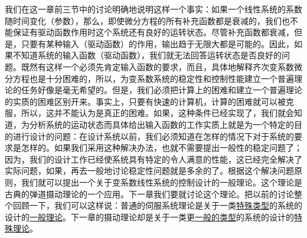 我们在这一章前三节中的讨论明确地说明这样一个事实：如果一个线性系统的系数随时间变化（参数），那么，即使微分方程的所有补充函数都是衰减的，我们也不能保证有驱动函数作用时这个系统还有良好的运转状态。尽管补充函数都衰减，但是，只要有某种输入（驱动函数）的作用，输出趋于无限大都是可能的。因此，如果不知道系统的输入函数（驱动函数），我们就无法回答运转状态是否良好的问题。既然有这样一个必须先肯定输入函数的要求，而且，具体地解释齐次变系数微分方程也是十分困难的，所以，为变系数系统的稳定性和控制性能建立一个普遍理论的任务好像是毫无希望的。但是，我们必须把计算上的困难和建立一个普遍理论的实质的困难区别开来。事实上，只要有快速的计算机，计算的困难就可以被克服，所以，这并不能认为是真正的困难。如果，这种条件已经实现了，我们就会知道，为分析系统的运动状态而具体给出输入函数的工作实质上就是为一个特定的目的进行设计的问题：在设计系统以前，我们必须知道在怎样的情况下对于系统的要求是怎样的。如果我们采用这种解决办法，也就不需要提出一般性的稳定问题了；因为，我们的设计工作已经使系统具有特定的令人满意的性能，这已经完全解决了实际问题，如果，再去一般地讨论稳定性问题就是多余的了。根据这个解决问题原则，我们就可以提出一个关于变系数线性系统的控制设计的一般理论。这个理论是古典的弹道摄动理论的一个应用。下一章我们要就讨论这个理论。把以前的讨论整个回顾一下，我们可以这样说：普通的伺服系统理论是关于一类\underline{特殊类型}的系统的设计的\underline{一般理论}。下一章的摄动理论却是关于一类更\underline{一般的类型}的系统的设计的\underline{特殊理论}。
